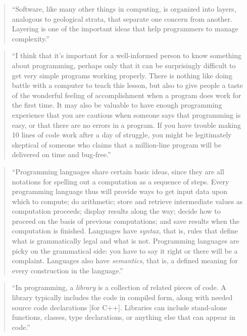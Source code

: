 \documentclass[]{tufte-book}
\begin{document}
\begin{quote}
``Software, like many other things in computing, is organized into layers, analogous to
geological strata, that separate one concern from another. Layering is one of the important
ideas that help programmers to manage complexity.'' \citep{kernighan2011d}
\end{quote}

\begin{quote}
``I think that it's important for a well-informed person to know something about
programming, perhaps only that it can be surprisingly difficult to get very simple
programs working properly. There is nothing like doing battle with a computer to teach
this lesson, but also to give people a taste of the wonderful feeling of accomplishment
when a program does work for the first time. It may also be valuable to have enough
programming experience that you are cautious when someone says that programming is easy,
or that there are no errors in a program. If you have trouble making 10 lines of code
work after a day of struggle, you might be legitimately skeptical of someone who claims
that a million-line program will be delivered on time and bug-free.'' \citep{kernighan2011d}
\end{quote}

\begin{quote}
``Programming languages share certain basic ideas, since they are all notations for spelling
out a computation as a sequence of steps. Every programming language thus will provide ways
to get input data upon which to compute; do arithmetic; store and retrieve intermediate
values as computation proceeds; display results along the way; decide how to proceed on the basis
of previous computations; and save results when the computation is finished. Languages have
\emph{syntax}, that is, rules that define what is grammatically legal and what is not.
Programming languages are picky on the grammatical side: you have to say it right or there
will be a complaint. Languages also have \emph{semantics}, that is, a defined meaning for every
construction in the language.'' \citep{kernighan2011d}
\end{quote}

\begin{quote}
``In programming, a \emph{library} is a collection of related pieces of code. A library typically
includes the code in compiled form, along with needed source code declarations {[}for C++{]}.
Libraries can include stand-alone functions, classes, type declarations, or anything else that
can appear in code.'' \citep{spraul2012think}
\end{quote}
\end{document}

